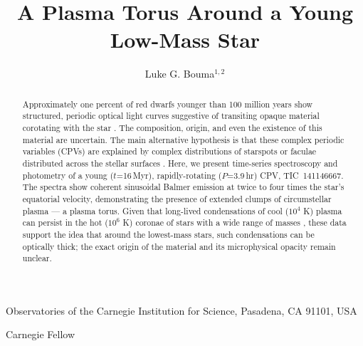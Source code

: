 \documentclass{nature3}
\title{A Plasma Torus Around a Young Low-Mass Star}
\newcommand{\carnegie}{Observatories of the Carnegie Institution for Science, Pasadena, CA 91101, USA}
\begin{document}
\author{Luke G. Bouma$^{1,2}$}

\maketitle

\scriptsize
\begin{affiliations}
\item \carnegie
\item Carnegie Fellow
\end{affiliations}
\normalsize


\begin{abstract}
\normalfont
Approximately one percent of red dwarfs younger than 100 million years
show structured, periodic optical light curves suggestive of
transiting opaque material corotating with the star
\cite{Rebull2016,Stauffer2017,Rebull2018,Bouma2024}.  The
composition, origin, and even the existence of this material are
uncertain. The main alternative hypothesis is that these complex
periodic variables (CPVs) are explained by complex distributions of
starspots or faculae distributed across the stellar surfaces
\cite{Koen2021}.  Here, we present time-series spectroscopy and
photometry of a young ($t$=16\,Myr), rapidly-rotating ($P$=3.9\,hr)
CPV, TIC~141146667. The spectra show coherent sinusoidal Balmer
emission at twice to four times the star's equatorial velocity,
demonstrating the presence of extended clumps of circumstellar
plasma --- a plasma torus.  Given that long-lived condensations of
cool ($10^4$ K) plasma can persist in the hot ($10^6$ K) coronae of
stars with a wide range of masses
\cite{CollierCameron1989,Townsend2005,Dunstone2006,Petit2013,Waugh2022,Daley-Yates2024},
these data support the idea that around the lowest-mass stars, such
condensations can be optically thick; the exact origin of the
material and its microphysical opacity remain unclear.
\end{abstract}

\maketitle

\end{document}
